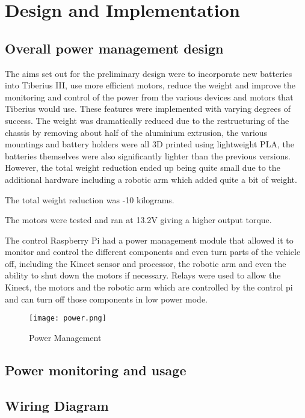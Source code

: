 \section{Design and Implementation}



\subsection{Overall power management design}

The aims set out for the preliminary design were to incorporate new batteries into Tiberius III, use more efficient motors, reduce the weight and improve the monitoring and control of the power from the various devices and motors that Tiberius would use.  These features were implemented with varying degrees of success.  
The weight was dramatically reduced due to the restructuring of the chassis by removing about half of the aluminium extrusion, the various mountings and battery holders were all 3D printed using lightweight PLA, the batteries themselves were also significantly lighter than the previous versions.  However, the total weight reduction ended up being quite small due to the additional hardware including a robotic arm which added quite a bit of weight.  

The total weight reduction was -10 kilograms.

The motors were tested and ran at 13.2V giving a higher output torque.

The control Raspberry Pi had a power management module that allowed it to monitor and control the different components and even turn parts of the vehicle off, including the Kinect sensor and processor, the robotic arm and even the ability to shut down the motors if necessary.  
Relays were used to allow the Kinect, the motors and the robotic arm which are controlled by the control pi and can turn off those components in low power mode.  

\begin{figure}[!htb]
\begin{center}
\texttt{[image: power.png]}
\end{center}
\caption{Power Management}
\label{fig:power}
\end{figure}

\subsection{Power monitoring and usage}
\subsection{Wiring Diagram}